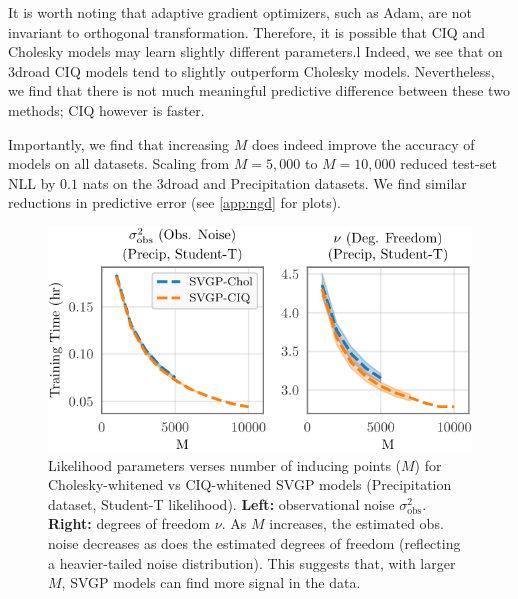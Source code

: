 It is worth noting that adaptive gradient optimizers, such as Adam, are not invariant to orthogonal transformation.
Therefore, it is possible that CIQ and Cholesky models may learn slightly different parameters.l
Indeed, we see that on 3droad CIQ models tend to slightly outperform Cholesky models.
Nevertheless, we find that there is not much meaningful predictive difference between these two methods; CIQ however is faster.

Importantly, we find that increasing $M$ does indeed improve the accuracy of models on all datasets.
Scaling from $M=5,\!000$ to $M=10,\!000$ reduced test-set NLL by $0.1$ nats on the 3droad and Precipitation datasets.
We find similar reductions in predictive error (see \cref{app:ngd} for plots).

\begin{figure}[t!]
  \centering
  \includegraphics[width=0.7\linewidth]{figures/variational_stats.pdf}
  \caption[Likelihood parameters verses number of inducing points ($M$) for Cholesky-whitened vs CIQ-whitened SVGP models.]{
    Likelihood parameters verses number of inducing points ($M$) for Cholesky-whitened vs CIQ-whitened SVGP models (Precipitation dataset, Student-T likelihood).
    {\bf Left:} observational noise $\sigma^2_\text{obs}$.
    {\bf Right:} degrees of freedom $\nu$.
    As $M$ increases, the estimated obs. noise decreases as does the estimated degrees of freedom (reflecting a heavier-tailed noise distribution).
    This suggests that, with larger $M$, SVGP models can find more signal in the data.
  }
  \label{fig:variational_stats}
\end{figure}

